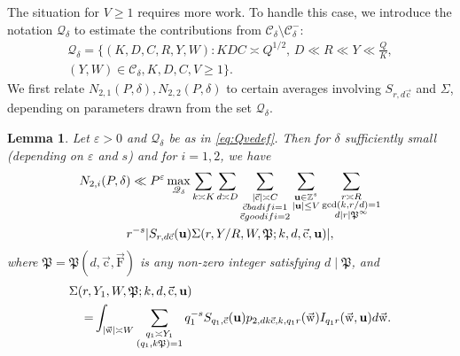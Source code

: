 \documentclass[letterpaper,11pt]{amsart}
\numberwithin{equation}{section}
\newtheorem{lemma}[theorem]{Lemma}
\theoremstyle{definition}
\numberwithin{equation}{section}
\newcommand{\ZZ}{\mathbb{Z}}
\newcommand{\uu}{\mathbf{u}}
\newcommand{\uw}{{\vec{\mathrm{w}}}}
\newcommand{\uF}{{\vec{\mathrm{F}} }}
\newcommand{\uc}{{\vec{\mathrm{c}}}}
\newcommand{\ve}{\varepsilon}
\begin{document}
The situation for $V\geq 1$ requires more work. To handle this case, we introduce the notation $\mathcal Q_\delta$ to estimate the contributions from $\mathcal{C}_\delta\setminus\mathcal{C}_\delta^-$:
\begin{align}\label{eq:Qvedef}
\mathcal Q_\delta
=
\Big\{(K, D, C,R,Y, W)
: KDC\asymp Q^{1/2},\, D\ll R\ll  
Y \ll \frac{Q}{K}, \\ (Y, W)\in \mathcal C_\delta, K, D, C, V\geq 1\Big\}.\nonumber
\end{align}
We first relate $N_{2,1}(P,\delta), N_{2,2}(P, \delta)$ to certain averages involving $S_{r,d\uc}$ and $\Sigma$, depending on parameters drawn from the set $\mathcal Q_\delta$. 
\begin{lemma}\label{lem:N2maxbound}
Let $\ve>0$ and $\mathcal Q_\delta$ be as in \eqref{eq:Qvedef}. Then for $\delta$ sufficiently small (depending on $\ve$ and $s$) and for $i=1,2$, we have
\begin{multline}\label{N2maxbound}
N_{2,i}(P, \delta)%
\ll P^{\ve}\max_{\substack{ \mathcal Q_\delta}}\sum_{k\asymp K}\sum_{d\asymp D}\sum_{\substack{|\uc| \asymp C\\ \uc \textup{ bad if }i=1\\ \uc \textup{ good if }i=2
}}\sum_{\substack{\uu \in \ZZ^s\\ |\uu|\leq V}}
\sum_{\substack{r\asymp R\\ \gcd(k,r/d)=1\\ d\mid r\mid \mathfrak P^\infty}}\\
r^{-s}|S_{r, d\uc}(\uu)\Sigma(r,Y/R, W, \mathfrak P;k,d,\uc, \uu)|, %
\end{multline}
where $\mathfrak P=\mathfrak P(d, \uc, \uF)$ is any non-zero integer satisfying $d\mid \mathfrak P$, and 
\begin{align*}
\MoveEqLeft\Sigma(r, Y_1, W, \mathfrak P;k,d, \uc, \uu)\\=&
 \int_{|\uw|\asymp W}\sum_{\substack{q_1\asymp Y_1\\ (q_1, k\mathfrak P)=1}}q_1^{-s} S_{q_1,\uc}(\uu)p_{2, dk\uc,k, q_1r}(\uw)I_{q_1r}(\uw, \uu) d\uw.
 \end{align*}
\end{lemma}
\end{document}
